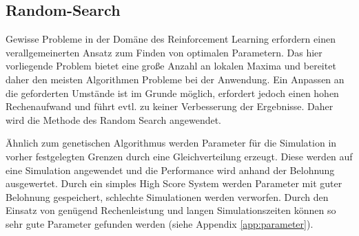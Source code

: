	\subsection{Random-Search}
		Gewisse Probleme in der Domäne des Reinforcement Learning erfordern einen verallgemeinerten Ansatz zum Finden von optimalen Parametern. Das hier vorliegende Problem bietet eine große Anzahl an lokalen Maxima und bereitet daher den meisten Algorithmen Probleme bei der Anwendung. Ein Anpassen an die geforderten Umstände ist im Grunde möglich, erfordert jedoch einen hohen Rechenaufwand und führt evtl. zu keiner Verbesserung der Ergebnisse. Daher wird die Methode des Random Search angewendet.
		
		Ähnlich zum genetischen Algorithmus werden Parameter für die Simulation in vorher festgelegten Grenzen durch eine Gleichverteilung erzeugt. Diese werden auf eine Simulation angewendet und die Performance wird anhand der Belohnung ausgewertet. Durch ein simples High Score System werden Parameter mit guter Belohnung gespeichert, schlechte Simulationen werden verworfen. Durch den Einsatz von genügend Rechenleistung und langen Simulationszeiten können so sehr gute Parameter gefunden werden (siehe Appendix \ref{app:parameter}).
	
